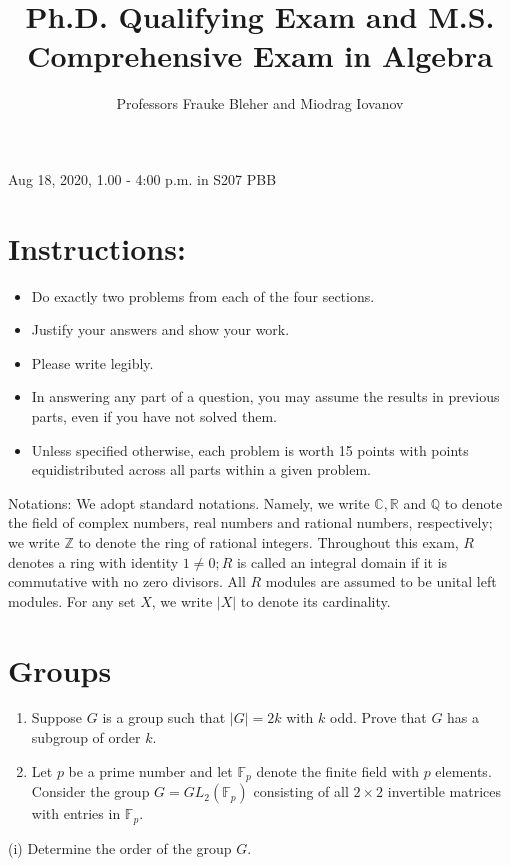 \documentclass[10pt]{article}
\title{Ph.D. Qualifying Exam and M.S. Comprehensive Exam in Algebra }
\author{Professors Frauke Bleher and Miodrag Iovanov}
\date{}
\begin{document}
\maketitle

Aug 18, 2020, 1.00 - 4:00 p.m. in S207 PBB

\section*{Instructions: }
\begin{itemize}
  \item Do exactly two problems from each of the four sections.

  \item Justify your answers and show your work.

  \item Please write legibly.

  \item In answering any part of a question, you may assume the results in previous parts, even if you have not solved them.

  \item Unless specified otherwise, each problem is worth 15 points with points equidistributed across all parts within a given problem.

\end{itemize}
Notations: We adopt standard notations. Namely, we write $\mathbb{C}, \mathbb{R}$ and $\mathbb{Q}$ to denote the field of complex numbers, real numbers and rational numbers, respectively; we write $\mathbb{Z}$ to denote the ring of rational integers. Throughout this exam, $R$ denotes a ring with identity $1 \neq 0 ; R$ is called an integral domain if it is commutative with no zero divisors. All $R$ modules are assumed to be unital left modules. For any set $X$, we write $|X|$ to denote its cardinality.

\section{Groups}
\begin{enumerate}
  \item Suppose $G$ is a group such that $|G|=2 k$ with $k$ odd. Prove that $G$ has a subgroup of order $k$.

  \item Let $p$ be a prime number and let $\mathbb{F}_{p}$ denote the finite field with $p$ elements. Consider the group $G=G L_{2}\left(\mathbb{F}_{p}\right)$ consisting of all $2 \times 2$ invertible matrices with entries in $\mathbb{F}_{p}$.

\end{enumerate}
(i) Determine the order of the group $G$.
\end{document}
